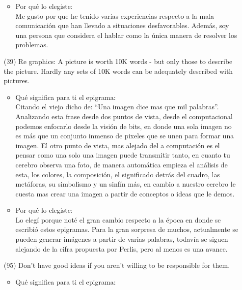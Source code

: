 \documentclass{article}
\begin{document}
\begin{itemize}
\begin{itemize}
        \item Por qué lo elegiste:\\
        Me gusto por que he tenido varias experiencias respecto a la mala comunicación que han llevado a situaciones desfavorables. Además, soy una persona que considera el hablar como la única manera de resolver los problemas.
    \end{itemize}
    \item[(39)]Re graphics: A picture is worth 10K words - but only those to describe the picture. Hardly any sets of 10K words can be adequately described with pictures.
    \begin{itemize}
        \item Qué significa para ti el epigrama:\\
        Citando el viejo dicho de: “Una imagen dice mas que mil palabras”. Analizando esta frase desde dos puntos de vista, desde el computacional podemos enfocarlo desde la visión de bits, en donde una sola imagen no es más que un conjunto inmenso de pixeles que se unen para formar una imagen. El otro punto de vista, mas alejado del a computación es el pensar como una solo una imagen puede transmitir tanto, en cuanto tu cerebro observa una foto, de manera automática empieza el análisis de esta, los colores, la composición, el significado detrás del cuadro, las metáforas, su simbolismo y un sinfín más, en cambio a nuestro cerebro le cuesta mas crear una imagen a partir de conceptos o ideas que le demos.
        \item Por qué lo elegiste:\\
        Lo elegí porque noté el gran cambio respecto a la época en donde se escribió estos epigramas. Para la gran sorpresa de muchos, actualmente se pueden generar imágenes a partir de varias palabras, todavía se siguen alejando de la cifra propuesta por Perlis, pero al menos es una avance.
    \end{itemize}
    \item[(95)]Don’t have good ideas if you aren't willing to be responsible for them.
    \begin{itemize}
        \item Qué significa para ti el epigrama:\\

\end{itemize}
\end{itemize}
\end{document}
